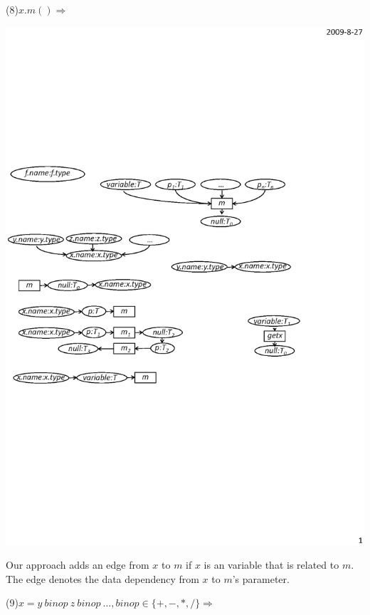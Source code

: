 (8)$x.m()\Rightarrow$
\begin{center}
\includegraphics[scale=0.7,clip]{figure/rule8.eps}%
\end{center}

Our approach adds an edge from $x$ to $m$ if $x$ is an variable that
is related to $m$. The edge denotes the data dependency from $x$ to
$m$'s parameter.

(9)$x=y\ binop\ z\ binop\ \ldots, binop\in \{+,-,*,/\} \Rightarrow $


